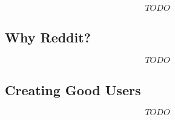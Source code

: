 \[ TODO \]

\subsection{Why Reddit?}
\label{sub:why_reddit}

\[ TODO \]


\subsection{Creating Good Users}
\label{sub:creating_good_users}

\[ TODO \]

